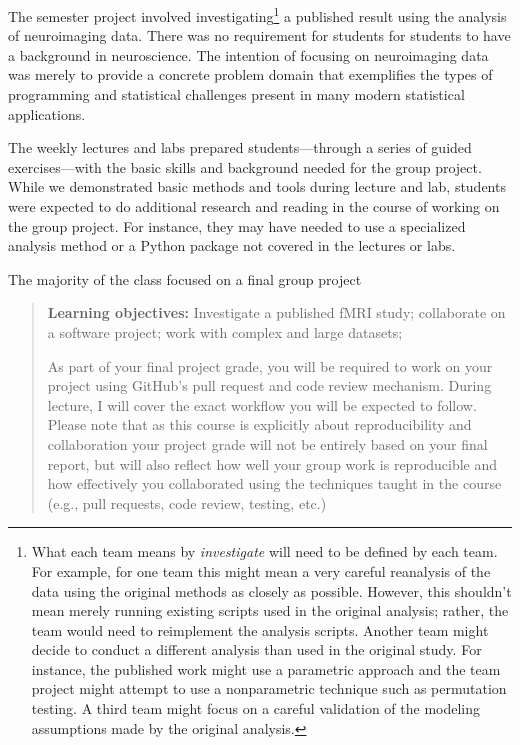 The semester project involved investigating\footnote{What each team means by
\emph{investigate} will need to be defined by each team.
For example, for one team this might mean a very careful reanalysis of the data
using the original methods as closely as possible.  However, this shouldn't
mean merely running existing scripts used in the original analysis; rather, the
team would need to reimplement the analysis scripts.  Another team might decide
to conduct a different analysis than used in the original study.  For instance,
the published work might use a parametric approach and the team project might
attempt to use a nonparametric technique such as permutation testing.  A third
team might focus on a careful validation of the modeling assumptions made by
the original analysis.}
a published result using the analysis of neuroimaging data.
There was no requirement for students for students to have a background in
neuroscience.
The intention of focusing on neuroimaging data was  merely to provide a
concrete problem domain that exemplifies the types of programming and
statistical challenges present in many modern statistical applications.

The weekly lectures and labs prepared students---through a
series of guided exercises---with the basic skills and
background needed for the group project.
While we demonstrated basic methods and tools during lecture and lab,
students were expected to do additional research and reading in the course
of working on the group project.
For instance, they may have needed to use a specialized analysis
method or a Python package not covered in the lectures or labs.

The majority of the class focused on a final group project

\begin{quote}
\textbf{Learning objectives:} Investigate a published fMRI study;
collaborate on a software project; work with complex and large datasets;

As part of your final project grade, you will be required to work on your
project using GitHub's pull request and code review mechanism.  During lecture,
I will cover the exact workflow you will be expected to follow.  Please note
that as this course is explicitly about reproducibility and collaboration your
project grade will not be entirely based on your final report, but will also
reflect how well your group work is reproducible and how effectively you
collaborated using the techniques taught in the course (e.g., pull requests,
code review, testing, etc.)
\end{quote}

